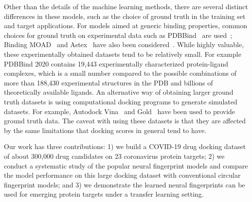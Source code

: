 \documentclass[conference]{IEEEtran}
\begin{document}
Other than the details of the machine learning methods, there are several distinct differences in these models, such as the choice of ground truth in the training set and target applications. For models aimed at generic binding properties, common choices for ground truth on experimental data such as PDBBind~\cite{Liu2014} are used~\cite{Ahmed2021,Ashtawy2015,Hsin2013,Ballester2010}; Binding MOAD~\cite{Hu2005} and Astex~\cite{Hartshorn2007} have also been considered~\cite{Bjerrum2016}. While highly valuable, these experimentally obtained datasets tend to be relatively small. For example PDBBind 2020 contains 19,443 experimentally characterized protein-ligand complexes, which is a small number compared to the possible combinations of more than 188,430 experimental structures in the PDB and billions of theoretically available ligands. An alternative way of obtaining larger ground truth datasets is using computational docking programs to generate simulated datasets. For example, Autodock Vina~\cite{Trott2010,McNutt2021,Morrone2020,Chandak2020} and Gold~\cite{Jones1997,Fernandes2021} have been used to provide ground truth data. The caveat with using these datasets is that they are affected by the same limitations that docking scores in general tend to have. 


Our work has three contributions: 
1) we build a COVID-19 drug docking dataset of about 300,000 drug candidates on 23 coronavirus protein targets;
2) we conduct a systematic study of the popular neural fingerprint models and compare the model performance on this large docking dataset with conventional circular fingerprint models; and
3) we demonstrate the learned neural fingerprints can be used for emerging protein targets under a transfer learning setting.


\end{document}
